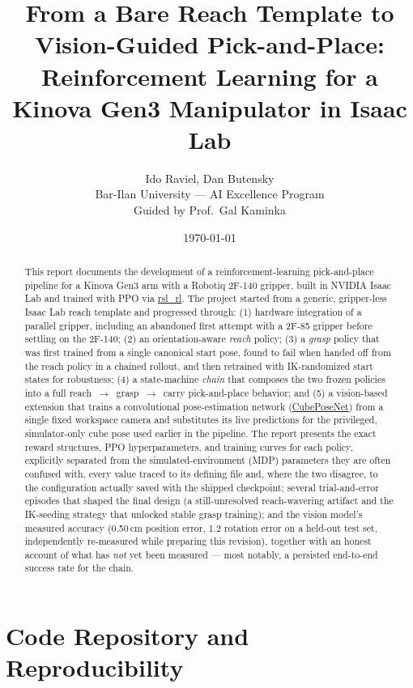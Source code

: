 \documentclass[11pt]{article}
\title{\textbf{From a Bare Reach Template to Vision-Guided Pick-and-Place:\\
Reinforcement Learning for a Kinova Gen3 Manipulator in Isaac Lab}}
\author{Ido Raviel, Dan Butensky \\ \small Bar-Ilan University --- AI Excellence Program \\ \small Guided by Prof.\ Gal Kaminka}
\date{\today}
\begin{document}
\maketitle

\begin{abstract}
This report documents the development of a reinforcement-learning pick-and-place
pipeline for a Kinova Gen3 arm with a Robotiq 2F-140 gripper, built in NVIDIA Isaac
Lab and trained with PPO via \url{rsl_rl}. The project started from a generic,
gripper-less Isaac Lab reach template and progressed through: (1) hardware
integration of a parallel gripper, including an abandoned first attempt with a
2F-85 gripper before settling on the 2F-140; (2) an orientation-aware \emph{reach}
policy; (3) a \emph{grasp} policy that was first trained from a single canonical
start pose, found to fail when handed off from the reach policy in a chained
rollout, and then retrained with IK-randomized start states for robustness; (4) a
state-machine \emph{chain} that composes the two frozen policies into a full
reach~$\to$~grasp~$\to$~carry pick-and-place behavior; and (5) a vision-based
extension that trains a convolutional pose-estimation network (\url{CubePoseNet})
from a single fixed workspace camera and substitutes its live predictions for the
privileged, simulator-only cube pose used earlier in the pipeline. The report
presents the exact reward structures, PPO hyperparameters, and training curves for
each policy, explicitly separated from the simulated-environment (MDP) parameters
they are often confused with, every value traced to its defining file and, where the
two disagree, to the configuration actually saved with the shipped checkpoint;
several trial-and-error episodes that shaped the final design (a still-unresolved
reach-wavering artifact and the IK-seeding strategy that unlocked stable grasp
training); and the vision model's measured accuracy (0.50\,cm position error,
1.2\textdegree{} rotation error on a held-out test set, independently re-measured
while preparing this revision), together with an honest account of what has
\emph{not} yet been measured --- most notably, a persisted end-to-end success rate
for the chain.
\end{abstract}

\clearpage
\section*{Code Repository and Reproducibility}
\label{sec:repo}
\end{document}
